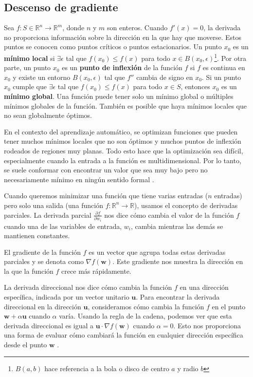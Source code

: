\subsection{Descenso de gradiente}


Sea $f: S \in \mathbb{R}^n \to \mathbb{R}^m$, donde $n$ y $m$ son enteros. Cuando $f'(x) = 0$, la derivada no proporciona información sobre la dirección en la que hay que moverse. Estos puntos se conocen como puntos críticos o puntos estacionarios. Un punto $x_0$ es un \textbf{mínimo local} si $\exists \epsilon$ tal que $f(x_0) \leq f(x)$ para todo $x \in B(x_0, \epsilon)$\footnote{$B(a,b)$ hace referencia a la bola o disco de centro $a$ y radio $b$}. Por otra parte, un punto \( x_0 \) es un \textbf{punto de inflexión} de la función \( f \) si \( f \) es continua en \( x_0 \) y existe un entorno \( B(x_0, \epsilon) \) tal que \( f'' \) cambia de signo en \( x_0 \). Si un punto $x_0$ cumple que $\exists \epsilon$ tal que $f(x_0) \leq f(x)$ para todo $x \in S$, entonces $x_0$ es un \textbf{mínimo global}. Una función puede tener solo un mínimo global o múltiples mínimos globales de la función. También es posible que haya mínimos locales que no sean globalmente óptimos. 

En el contexto del aprendizaje automático, se optimizan funciones que pueden tener muchos mínimos locales que no son óptimos y muchos puntos de inflexión rodeados de regiones muy planas. Todo esto hace que la optimización sea difícil, especialmente cuando la entrada a la función es multidimensional. Por lo tanto, se suele conformar con encontrar un valor que sea muy bajo pero no necesariamente mínimo en ningún sentido formal \citep{pajares2021aprendizaje}. 

Cuando queremos minimizar una función que tiene varias entradas (\(n\) entradas) pero solo una salida (una función \( f : \mathbb{R}^n \to \mathbb{R} \)), usamos el concepto de derivadas parciales. La derivada parcial \(\frac{\partial f}{\partial w_i}\) nos dice cómo cambia el valor de la función \(f\) cuando una de las variables de entrada, \(w_i\), cambia mientras las demás se mantienen constantes.

El gradiente de la función \( f \) es un vector que agrupa todas estas derivadas parciales y se denota como \(\nabla f(\mathbf{w})\). Este gradiente nos muestra la dirección en la que la función \( f \) crece más rápidamente.

La derivada direccional nos dice cómo cambia la función \( f \) en una dirección específica, indicada por un vector unitario \(\mathbf{u}\). Para encontrar la derivada direccional en la dirección \(\mathbf{u}\), consideramos cómo cambia la función \( f \) en el punto \(\mathbf{w} + \alpha \mathbf{u}\) cuando \(\alpha\) varía. Usando la regla de la cadena, podemos ver que esta derivada direccional es igual a $\mathbf{u} \cdot \nabla f(\mathbf{w})$ cuando $\alpha = 0$. Esto nos proporciona una forma de evaluar cómo cambiará la función en cualquier dirección específica desde el punto \(\mathbf{w}\) \citep{pajares2021aprendizaje}.

